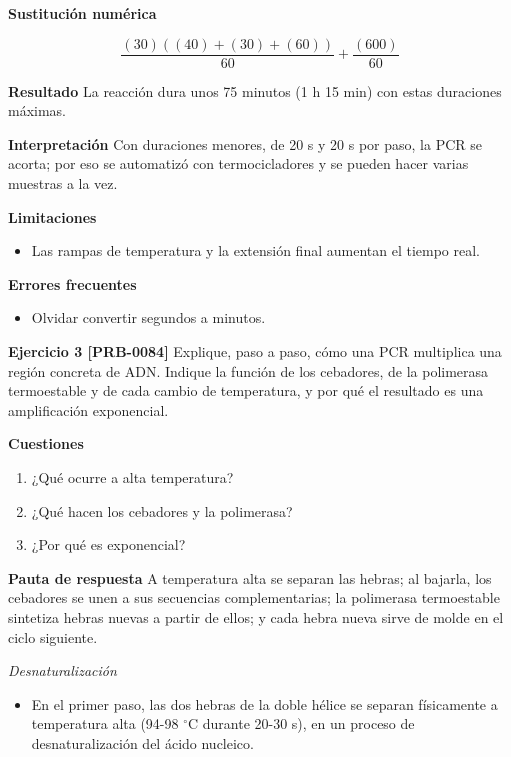 \documentclass{book}
\begin{document}
\noindent\textbf{Sustitución numérica}

\[
\frac{\left(30\right) \left(\left(40\right) + \left(30\right) + \left(60\right)\right)}{60} + \frac{\left(600\right)}{60}
\]

\noindent\textbf{Resultado}
La reacción dura unos 75 minutos (1 h 15 min) con estas duraciones máximas.


\noindent\textbf{Interpretación}
Con duraciones menores, de 20 s y 20 s por paso, la PCR se acorta; por eso se automatizó con termocicladores y se pueden hacer varias muestras a la vez.


\noindent\textbf{Limitaciones}
\begin{itemize}
\item Las rampas de temperatura y la extensión final aumentan el tiempo real.
\end{itemize}

\noindent\textbf{Errores frecuentes}
\begin{itemize}
\item Olvidar convertir segundos a minutos.
\end{itemize}

\noindent\textbf{Ejercicio 3 [PRB-0084]}
Explique, paso a paso, cómo una PCR multiplica una región concreta de ADN. Indique la función de los cebadores, de la polimerasa termoestable y de cada cambio de temperatura, y por qué el resultado es una amplificación exponencial.


\noindent\textbf{Cuestiones}
\begin{enumerate}
\item ¿Qué ocurre a alta temperatura?
\item ¿Qué hacen los cebadores y la polimerasa?
\item ¿Por qué es exponencial?
\end{enumerate}

\noindent\textbf{Pauta de respuesta}
A temperatura alta se separan las hebras; al bajarla, los cebadores se unen a sus secuencias complementarias; la polimerasa termoestable sintetiza hebras nuevas a partir de ellos; y cada hebra nueva sirve de molde en el ciclo siguiente.


\noindent\textit{Desnaturalización}
\begin{itemize}
\item En el primer paso, las dos hebras de la doble hélice se separan físicamente a temperatura alta (94-98 \(^{\circ}\)C durante 20-30 s), en un proceso de desnaturalización del ácido nucleico.
\end{itemize}
\end{document}
